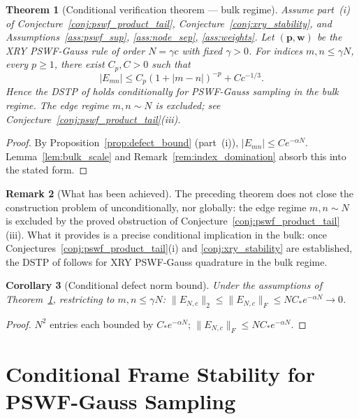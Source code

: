 \documentclass[12pt,a4paper]{amsart}
\newtheorem{theorem}{Theorem}[section]
\newtheorem{corollary}[theorem]{Corollary}
\theoremstyle{definition}
\newtheorem{remark}[theorem]{Remark}
\newcommand{\EN}{E_{N,c}}
\newcommand{\norm}[1]{\|#1\|}
\begin{document}
\begin{theorem}[Conditional verification theorem --- bulk
regime]\label{thm:compatibility_verified}
Assume part~(i) of Conjecture~\ref{conj:pswf_product_tail},
Conjecture~\ref{conj:xry_stability}, and Assumptions~\ref{ass:pswf_sup},
\ref{ass:node_sep}, \ref{ass:weights}. Let $(\mathbf{p},\mathbf{w})$
be the XRY PSWF-Gauss rule of order $N=\gamma c$ with fixed $\gamma>0$.
For indices $m,n\le\gamma N$, every $p\ge1$, there exist $C_p,C>0$ such that
\[
  |E_{mn}|\le C_p(1+|m-n|)^{-p}+Cc^{-1/3}.
\]
Hence the DSTP of \cite{PaperI} holds conditionally for
PSWF-Gauss sampling in the bulk regime.
The edge regime $m,n\sim N$ is excluded;
see Conjecture~\ref{conj:pswf_product_tail}(iii).
\end{theorem}
\begin{proof}
By Proposition~\ref{prop:defect_bound} (part~(i)),
$|E_{mn}|\le Ce^{-\alpha N}$.
Lemma~\ref{lem:bulk_scale} and Remark~\ref{rem:index_domination}
absorb this into the stated form.
\end{proof}

\begin{remark}[What has been achieved]
The preceding theorem does not close the construction problem of
\cite{PaperI} unconditionally, nor globally: the edge regime
$m,n\sim N$ is excluded by the proved obstruction of
Conjecture~\ref{conj:pswf_product_tail}(iii).
What it provides is a precise conditional implication in the bulk:
once Conjectures~\ref{conj:pswf_product_tail}(i) and
\ref{conj:xry_stability} are established, the DSTP
of \cite{PaperI} follows for XRY PSWF-Gauss quadrature
in the bulk regime.
\end{remark}

\begin{corollary}[Conditional defect norm bound]\label{cor:defect_norm}
Under the assumptions of Theorem~\ref{thm:compatibility_verified},
restricting to $m,n\le\gamma N$:
$\norm{\EN}_2\le\norm{\EN}_F\le N C_* e^{-\alpha N}\to0$.
\end{corollary}
\begin{proof}
$N^2$ entries each bounded by $C_*e^{-\alpha N}$;
$\norm{\EN}_F\le NC_*e^{-\alpha N}$.
\end{proof}

\section{Conditional Frame Stability for PSWF-Gauss Sampling}\label{sec:stability}
\end{document}
